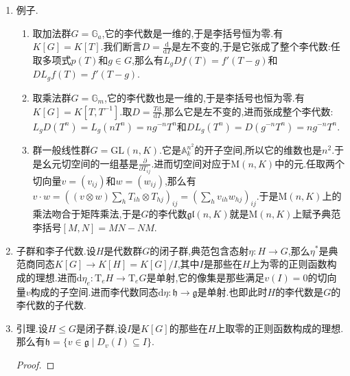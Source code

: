 \begin{enumerate}
\begin{proof}
    	任取$g_1,g_2\in G$和$f\in A$有:
    	\begin{align*}
    		\mathrm{Ad}(g_1)(D)f(g_2)&=D(L_{g_2^{-1}}\mathrm{Int}(g_1)^*f)(e)\\&=D(L_{g_2^{-1}}L_{g_1^{-1}}R_{g_1^{-1}}f)(e)\\&=D(R_{g_1^{-1}}f)(g_2g_1)\\&=R_{g_1}DR_{g_1^{-1}}f(g_2)
    	\end{align*}
    \end{proof}
    \item 例子.
    \begin{enumerate}[(1)]
    	\item 取加法群$G=\mathbb{G}_a$,它的李代数是一维的,于是李括号恒为零.有$K[G]=K[T]$.我们断言$D=\frac{\mathrm{d}}{\mathrm{d}T}$是左不变的,于是它张成了整个李代数:任取多项式$p(T)$和$g\in G$,那么有$L_gDf(T)=f'(T-g)$和$DL_gf(T)=f'(T-g)$.
    	\item 取乘法群$G=\mathbb{G}_m$,它的李代数也是一维的,于是李括号也恒为零.有$K[G]=K[T,T^{-1}]$.取$D=\frac{T\mathrm{d}}{\mathrm{d}T}$,那么它是左不变的,进而张成整个李代数:$L_gD(T^n)=L_g(nT^n)=ng^{-n}T^n$和$DL_g(T^n)=D(g^{-n}T^n)=ng^{-n}T^n$.
    	\item 群一般线性群$G=\mathrm{GL}(n,K)$.它是$\mathbb{A}_k^{n^2}$的开子空间,所以它的维数也是$n^2$.于是幺元切空间的一组基是$\frac{\partial}{\partial T_{ij}}$.进而切空间对应于$\mathrm{M}(n,K)$中的元.任取两个切向量$v=(v_{ij})$和$w=(w_{ij})$,那么有$v\cdot w=\left((v\otimes w)\sum_hT_{ih}\otimes T_{hj}\right)_{ij}=\left(\sum_hv_{ih}w_{hj}\right)_{ij}$.于是$\mathrm{M}(n,K)$上的乘法吻合于矩阵乘法,于是$G$的李代数$\mathfrak{gl}(n,K)$就是$\mathrm{M}(n,K)$上赋予典范李括号$[M,N]=MN-NM$.
    \end{enumerate}
    \item 子群和李子代数.设$H$是代数群$G$的闭子群,典范包含态射$\eta:H\to G$,那么$\eta^*$是典范商同态$K[G]\to K[H]=K[G]/I$,其中$I$是那些在$H$上为零的正则函数构成的理想.进而$\mathrm{d}\eta_e:\mathrm{T}_eH\to\mathrm{T}_eG$是单射,它的像集是那些满足$v(I)=0$的切向量$v$构成的子空间.进而李代数同态$\mathrm{d}\eta:\mathfrak{h}\to\mathfrak{g}$是单射.也即此时$H$的李代数是$G$的李代数的子代数.
    \item 引理.设$H\le G$是闭子群,设$I$是$K[G]$的那些在$H$上取零的正则函数构成的理想.那么有$\mathfrak{h}=\{v\in\mathfrak{g}\mid D_v(I)\subseteq I\}$.
    \begin{proof}
    	

\end{proof}
\end{enumerate}
